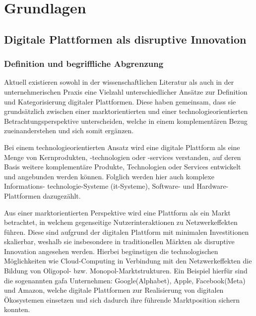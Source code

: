 \chapter{Grundlagen}

\section{Digitale Plattformen als disruptive Innovation}

\subsection{Definition und begriffliche Abgrenzung}

Aktuell existieren sowohl in der wissenschaftlichen Literatur als auch in der unternehmerischen Praxis eine Vielzahl unterschiedlicher Ansätze zur Definition und Kategorisierung digitaler Plattformen. Diese haben gemeinsam, dass sie grundsätzlich zwischen einer marktorientierten und einer technologieorientierten Betrachtungsperspektive unterscheiden, welche in einem komplementären Bezug zueinanderstehen und sich somit ergänzen. \autocite[Vgl.][S. 21-23]{ENGELS2017} \autocite[Vgl.][S.99]{MEINHARDT2019}

Bei einem technologieorientierten Ansatz wird eine digitale Plattform als eine Menge von Kernprodukten, -technologien oder -services verstanden, auf deren Basis weitere komplementäre Produkte, Technologien oder Services entwickelt und angebunden werden können.\autocite[Vgl.][S. 21]{ENGELS2017} Folglich werden hier auch komplexe Informations- technologie-Systeme (\acs{it}-Systeme), Software- und Hardware-Plattformen dazugezählt.\autocite[Vgl.][S.222f]{WEINREICH2016}

Aus einer marktorientierten Perspektive wird eine Plattform als ein Markt betrachtet, in welchem gegenseitige Nutzerinteraktionen zu Netzwerkeffekten führen. \autocite[Vgl.][S. 1273f]{EISENMANN2011} Diese sind aufgrund der digitalen Plattform mit minimalen Investitionen skalierbar, weshalb sie insbesondere in traditionellen Märkten als disruptive Innovation angesehen werden. \autocite[Vgl.][S. 17ff]{MOAZED2016} Hierbei begünstigen die technologischen Möglichkeiten wie Cloud-Computing in Verbindung mit den Netzwerkeffekten die Bildung von Oligopol- bzw. Monopol-Marktstrukturen.\autocite[Vgl.][S. 23]{ENGELS2017} Ein Beispiel hierfür sind die sogenannten \acs{gafa} Unternehmen: Google(Alphabet), Apple, Facebook(Meta) und Amazon, welche digitale Plattformen zur Realisierung von digitalen Ökosystemen einsetzen und sich dadurch ihre führende Marktposition sichern konnten. \autocite[Vgl.][S. 92f]{BUNTE2020} 

